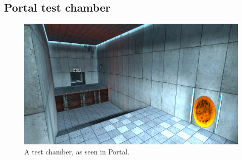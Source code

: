 \begin{appendices}
	\pagebreak
	\section{Portal test chamber}
	\label{portalChamber}
	\begin{figure}[h!]
		\centering
		\includegraphics[angle=90,origin=c,scale=0.6]{pictures/portalChamber.jpg}
		\caption{A test chamber, as seen in Portal.\cite{portalChamberPic}}
	\end{figure}
\end{appendices}
